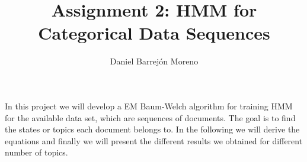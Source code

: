\documentclass[12pt]{article}
\begin{document}
	


\title{Assignment 2: HMM for Categorical Data Sequences}%
\author{Daniel Barrejón Moreno} %

\maketitle

In this project we will develop a EM Baum-Welch algorithm for training HMM for the available data set, which are sequences of documents. The goal is to find the states or topics each document belongs to. In the following we will derive the equations and finally we will present the different results we obtained for different number of topics.
\end{document}
